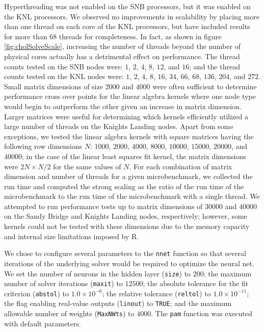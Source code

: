 Hyperthreading was not enabled on the SNB processors, but it was enabled on the KNL
processors. We observed no improvements in scalability by placing more than one thread on
each core of the KNL processors, but have included results for more than 68 threads for
completeness. In fact, as shown in figure \ref{fig:cholSolveScale}, increasing the number
of threads beyond the number of physical cores actually has a detrimental effect on
performance. The thread counts tested on the SNB nodes were: $1$, $2$, $4$, $8$, $12$, and
$16$; and the thread counts tested on the KNL nodes were: $1$, $2$, $4$, $8$, $16$, $34$,
$66$, $68$, $136$, $204$, and $272$. Small matrix dimensions of size $2000$ and $4000$
were often sufficient to determine performance cross over points for the linear algebra
kernels where one node type would begin to outperform the other given an increase in
matrix dimension. Larger matrices were useful for determining which kernels efficiently
utilized a large number of threads on the Knights Landing nodes. Apart from some
exceptions, we tested the linear algebra kernels with square matrices having the following
row dimensions $N$: $1000$, $2000$, $4000$, $8000$, $10000$, $15000$, $20000$, and
$40000$; in the case of the linear least squares fit kernel, the matrix dimensions were
$2N \times N/2$ for the same values of $N$. For each combination of matrix dimension and
number of threads for a given microbenchmark, we collected the run time and computed the
strong scaling as the ratio of the run time of the microbenchmark to the run time of the
microbenchmark with a single thread. We attempted to run performance tests up to matrix
dimensions of $30000$ and $40000$ on the Sandy Bridge and Knights Landing nodes,
respectively; however, some kernels could not be tested with these dimensions due to the
memory capacity and internal size limitations imposed by R.

We chose to configure several parameters to the \texttt{nnet} function so that
  several iterations of the underlying solver would be required to optimize
  the neural net.
We set the number of neurons in the hidden layer (\texttt{size}) to $200$;
  the maximum number of solver iterations (\texttt{maxit}) to $12500$;
  the absolute tolerance for the fit criterion (\texttt{abstol}) to $1.0\times 10^{-6}$;
  the relative tolerance (\texttt{reltol}) to $1.0\times 10^{-11}$;
  the flag enabling real-value outputs (\texttt{linout}) to \texttt{TRUE}; and
  the maximum allowable number of weights (\texttt{MaxNWts}) to $4000$.
The \texttt{pam} function was executed with default parameters.

